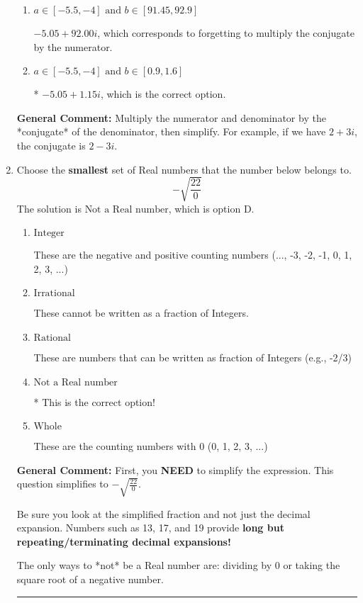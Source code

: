 \documentclass{extbook}[14pt]
\newcommand{\litem}[1]{\item #1

\rule{\textwidth}{0.4pt}}
\begin{document}
\begin{enumerate}
{\begin{enumerate}[label=\Alph*.]
 $-404.00  + 1.15 i$, which corresponds to forgetting to multiply the conjugate by the numerator and using a plus instead of a minus in the denominator.
\item \( a \in [-5.5, -4] \text{ and } b \in [91.45, 92.9] \)

 $-5.05  + 92.00 i$, which corresponds to forgetting to multiply the conjugate by the numerator.
\item \( a \in [-5.5, -4] \text{ and } b \in [0.9, 1.6] \)

* $-5.05  + 1.15 i$, which is the correct option.
\end{enumerate}

\textbf{General Comment:} Multiply the numerator and denominator by the *conjugate* of the denominator, then simplify. For example, if we have $2+3i$, the conjugate is $2-3i$.
}
\litem{
Choose the \textbf{smallest} set of Real numbers that the number below belongs to.
\[ -\sqrt{\frac{22}{0}} \]The solution is \( \text{Not a Real number} \), which is option D.\begin{enumerate}[label=\Alph*.]
\item \( \text{Integer} \)

These are the negative and positive counting numbers (..., -3, -2, -1, 0, 1, 2, 3, ...)
\item \( \text{Irrational} \)

These cannot be written as a fraction of Integers.
\item \( \text{Rational} \)

These are numbers that can be written as fraction of Integers (e.g., -2/3)
\item \( \text{Not a Real number} \)

* This is the correct option!
\item \( \text{Whole} \)

These are the counting numbers with 0 (0, 1, 2, 3, ...)
\end{enumerate}

\textbf{General Comment:} First, you \textbf{NEED} to simplify the expression. This question simplifies to $-\sqrt{\frac{22}{0}}$. 
 
 Be sure you look at the simplified fraction and not just the decimal expansion. Numbers such as 13, 17, and 19 provide \textbf{long but repeating/terminating decimal expansions!} 
 
 The only ways to *not* be a Real number are: dividing by 0 or taking the square root of a negative number. 
 
}
\end{enumerate}
\end{document}
